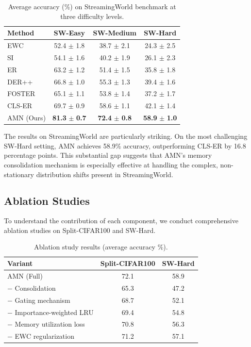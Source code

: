 \documentclass[11pt]{article}
\begin{document}
\begin{table}[h]
\centering
\caption{Average accuracy (\%) on StreamingWorld benchmark at three difficulty levels.}
\label{tab:streaming}
\begin{tabular}{lccc}
\hline
Method & SW-Easy & SW-Medium & SW-Hard \\
\hline
EWC & 52.4 $\pm$ 1.8 & 38.7 $\pm$ 2.1 & 24.3 $\pm$ 2.5 \\
SI & 54.1 $\pm$ 1.6 & 40.2 $\pm$ 1.9 & 26.1 $\pm$ 2.3 \\
ER & 63.2 $\pm$ 1.2 & 51.4 $\pm$ 1.5 & 35.8 $\pm$ 1.8 \\
DER++ & 66.8 $\pm$ 1.0 & 55.3 $\pm$ 1.3 & 39.4 $\pm$ 1.6 \\
FOSTER & 65.1 $\pm$ 1.1 & 53.8 $\pm$ 1.4 & 37.2 $\pm$ 1.7 \\
CLS-ER & 69.7 $\pm$ 0.9 & 58.6 $\pm$ 1.1 & 42.1 $\pm$ 1.4 \\
\hline
AMN (Ours) & \textbf{81.3} $\pm$ \textbf{0.7} & \textbf{72.4} $\pm$ \textbf{0.8} & \textbf{58.9} $\pm$ \textbf{1.0} \\
\hline
\end{tabular}
\end{table}

The results on StreamingWorld are particularly striking. On the most challenging SW-Hard setting, AMN achieves 58.9\% accuracy, outperforming CLS-ER by 16.8 percentage points. This substantial gap suggests that AMN's memory consolidation mechanism is especially effective at handling the complex, non-stationary distribution shifts present in StreamingWorld.

\subsection{Ablation Studies}

To understand the contribution of each component, we conduct comprehensive ablation studies on Split-CIFAR100 and SW-Hard.

\begin{table}[h]
\centering
\caption{Ablation study results (average accuracy \%).}
\label{tab:ablation}
\begin{tabular}{lcc}
\hline
Variant & Split-CIFAR100 & SW-Hard \\
\hline
AMN (Full) & 72.1 & 58.9 \\
$-$ Consolidation & 65.3 & 47.2 \\
$-$ Gating mechanism & 68.7 & 52.1 \\
$-$ Importance-weighted LRU & 69.4 & 54.8 \\
$-$ Memory utilization loss & 70.8 & 56.3 \\
$-$ EWC regularization & 71.2 & 57.1 \\
\hline
\end{tabular}
\end{table}
\end{document}
